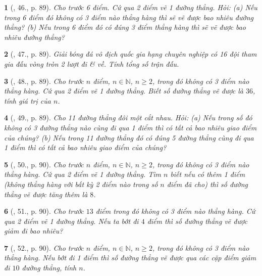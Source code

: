 \documentclass{article}
\newtheorem{baitoan}{}
\begin{document}
\begin{baitoan}[\cite{Tuyen_Toan_6}, 46., p. 89]
	Cho trước 6 điểm. Cứ qua 2 điểm vẽ 1 đường thẳng. Hỏi: (a) Nếu trong 6 điểm đó không có 3 điểm nào thẳng hàng thì sẽ vẽ được bao nhiêu đường thẳng? (b) Nếu trong 6 điểm đó có đúng 3 điểm thẳng hàng thì sẽ vẽ được bao nhiêu đường thẳng?
\end{baitoan}

\begin{baitoan}[\cite{Tuyen_Toan_6}, 47., p. 89]
	Giải bóng đá vô địch quốc gia hạng chuyên nghiệp có 16 đội tham gia đấu vòng tròn 2 lượt đi \& về. Tính tổng số trận đấu.
\end{baitoan}

\begin{baitoan}[\cite{Tuyen_Toan_6}, 48., p. 89]
	Cho trước $n$ điểm, $n\in\mathbb{N}$, $n\ge2$, trong đó không có 3 điểm nào thẳng hàng. Cứ qua 2 điểm vẽ 1 đường thẳng. Biết số đường thẳng vẽ được là $36$, tính giá trị của $n$.
\end{baitoan}

\begin{baitoan}[\cite{Tuyen_Toan_6}, 49., p. 89]
	Cho 11 đường thẳng đôi một cắt nhau. Hỏi: (a) Nếu trong số đó không có 3 đường thẳng nào cùng đi qua 1 điểm thì có tất cả bao nhiêu giao điểm của chúng? (b) Nếu trong 11 đường thẳng đó có đúng 5 đường thẳng cùng đi qua 1 điểm thì có tất cả bao nhiêu giao điểm của chúng?
\end{baitoan}

\begin{baitoan}[\cite{Tuyen_Toan_6}, 50., p. 90]
	Cho trước $n$ điểm, $n\in\mathbb{N}$, $n\ge2$, trong đó không có 3 điểm nào thẳng hàng. Cứ qua 2 điểm vẽ 1 đường thẳng. Tìm $n$ biết nếu có thêm 1 điểm (không thẳng hàng với bất kỳ 2 điểm nào trong số $n$ điểm đã cho) thì số đường thẳng vẽ được tăng thêm là $8$.
\end{baitoan}

\begin{baitoan}[\cite{Tuyen_Toan_6}, 51., p. 90]
	Cho trước $13$ điểm trong đó không có 3 điểm nào thẳng hàng. Cứ qua 2 điểm vẽ 1 đường thẳng. Nếu ta bớt đi $4$ điểm thì số đường thẳng vẽ được giảm đi bao nhiêu?
\end{baitoan}

\begin{baitoan}[\cite{Tuyen_Toan_6}, 52., p. 90]
	Cho trước $n$ điểm, $n\in\mathbb{N}$, $n\ge2$, trong đó không có 3 điểm nào thẳng hàng. Nếu bớt đi 1 điểm thì số đường thẳng vẽ được qua các cặp điểm giảm đi $10$ đường thẳng, tính $n$.
\end{baitoan}
\end{document}
